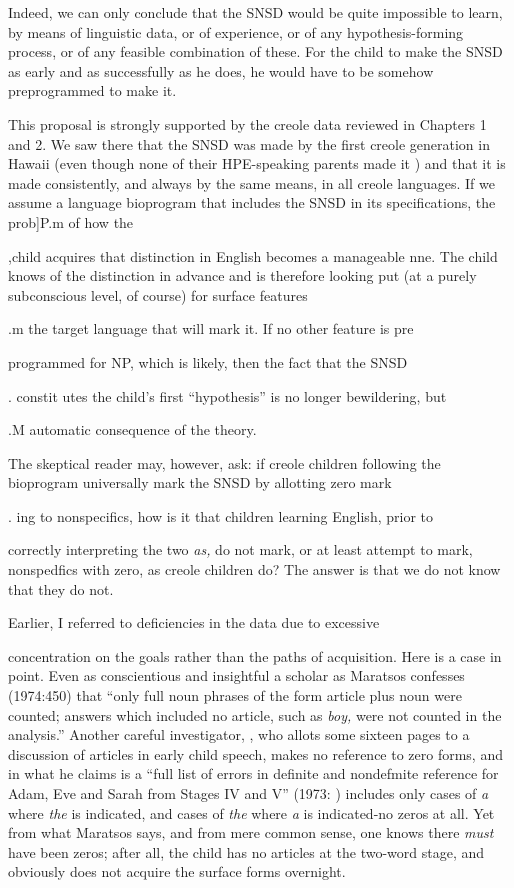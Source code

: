 Indeed, we can only conclude that the SNSD would be quite impossible to learn, by means of linguistic data, or of experience, or of any hypothesis-forming process, or of any feasible combination of these. For the child to make the SNSD as early and as successfully as he does, he would have to be somehow preprogrammed to make it.

This proposal is strongly supported by the creole data reviewed in Chapters 1 and 2. We saw there that the SNSD was made by the first creole generation in Hawaii (even though none of their HPE-speaking parents made it ) and that it is made consistently, and always by the same means, in all creole languages. If we assume a language bioprogram that includes the SNSD in its specifications, the prob]P.m of how the

,child acquires that distinction in English becomes a manageable nne. The child knows of the distinction in advance and is therefore looking put (at a purely subconscious level, of course) for surface features

.m the target language that will mark it. If no other feature is pre\-

programmed for NP, which is likely, then the fact that the SNSD

. constit utes the child's first ``hypothesis'' is no longer bewildering, but

.M automatic consequence of the theory.

The skeptical reader may, however, ask: if creole children follow\-ing the bioprogram universally mark the SNSD by allotting zero mark\-

. ing to nonspecifics, how is it that children learning English, prior to


correctly interpreting the two \textit{as,} do not mark, or at least attempt to mark, nonspedfics with zero, as creole children do? The answer is that we do not know that they do not.

Earlier, I referred to deficiencies in the data due to excessive

concentration on the goals rather than the paths of acquisition. Here is a case in point. Even as conscientious and insightful a scholar as Maratsos confesses (1974:450) that ``only full noun phrases of the form article plus noun were counted; answers which included no article, such as \textit{boy, }were not counted in the analysis.'' Another careful inves\-tigator, \citet{Brown1973}, who allots some sixteen pages to a discussion of articles in early child speech, makes no reference to zero forms, and in what he claims is a ``full list of errors in definite and nondefmite reference for Adam, Eve and Sarah from Stages IV and V'' (1973: ) includes only cases of \textit{a} where \textit{the} is indicated, and cases of \textit{the} where \textit{a} is indicated-no zeros at all. Yet from what Maratsos says, and from mere common sense, one knows there \textit{must} have been zeros; after all, the child has no articles at the two-word stage, and obviously does not acquire the surface forms overnight.

